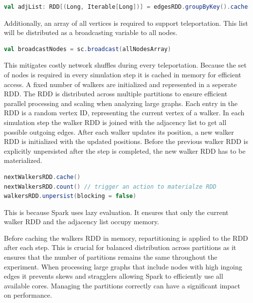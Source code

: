 \vspace{0.5em}
\begin{lstlisting}[language=Scala, caption={Adjacency list creation}, label={lst:adjlist}]
val adjList: RDD[(Long, Iterable[Long])] = edgesRDD.groupByKey().cache()
\end{lstlisting}
\vspace{0.5em}

Additionally, an array of all vertices is required to support teleportation. This list will be distributed as a broadcasting variable to all nodes.

\vspace{0.5em}
\begin{lstlisting}[language=Scala, caption={Broadcasting Variable}, label={lst:broadcast}]
val broadcastNodes = sc.broadcast(allNodesArray)
\end{lstlisting}
\vspace{0.5em}

This mitigates costly network shuffles during every teleportation. Because the set of nodes is required in every simulation step it is cached in memory for efficient access.
A fixed number of walkers are initialized and represented in a seperate RDD. The RDD is distributed across multiple partitions to ensure efficient parallel processing and scaling when analyzing large graphs. Each entry in the RDD is a random vertex ID, representing the current vertex of a walker. In each simulation step the walker RDD is joined with the adjacency list to get all possible outgoing edges. After each walker updates its position, a new walker RDD is initialized with the updated positions. Before the previous walker RDD is explicitly unpersisted after the step is completed, the new walker RDD has to be materialized.

\begin{lstlisting}[language=Scala, caption={Materializing and Unpersisting Walker RDD}, label={lst:materialize}]
nextWalkersRDD.cache() 
nextWalkersRDD.count() // trigger an action to materialze RDD
walkersRDD.unpersist(blocking = false)
\end{lstlisting}
\vspace{0.5em}
This is because Spark uses lazy evaluation. It ensures that only the current walker RDD and the adjacency list occupy memory. \par
Before caching the walkers RDD in memory, repartitioning is applied to the RDD after each step. This is crucial for balanced distribution across partitions as it ensures that the number of partitions remains the same throughout the experiment. 
When processing large graphs that include nodes with high ingoing edges it prevents skews and stragglers allowing Spark to efficiently use all available cores. Managing the partitions correctly can have a significant impact on performance. 


